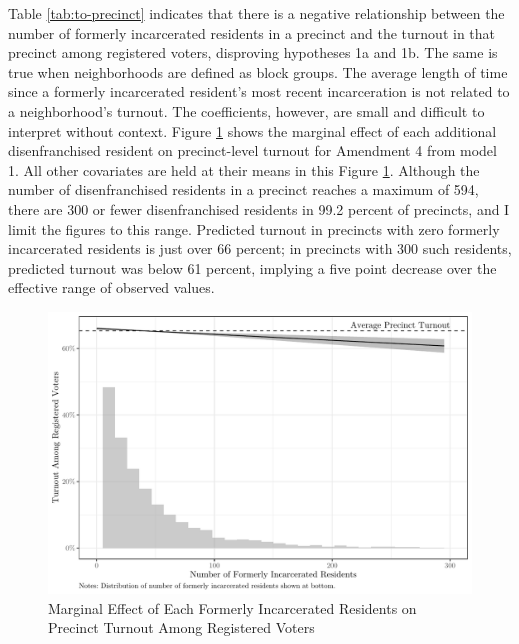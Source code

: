 \documentclass[
  12pt,
]{article}
\begin{document}
\begin{singlespace}


\end{singlespace}

Table \ref{tab:to-precinct} indicates that there is a negative relationship between the number of formerly incarcerated residents in a precinct and the turnout in that precinct among registered voters, disproving hypotheses 1a and 1b. The same is true when neighborhoods are defined as block groups. The average length of time since a formerly incarcerated resident's most recent incarceration is not related to a neighborhood's turnout. The coefficients, however, are small and difficult to interpret without context. Figure \ref{fig:marg1} shows the marginal effect of each additional disenfranchised resident on precinct-level turnout for Amendment 4 from model 1. All other covariates are held at their means in this Figure \ref{fig:marg1}. Although the number of disenfranchised residents in a precinct reaches a maximum of 594, there are 300 or fewer disenfranchised residents in 99.2 percent of precincts, and I limit the figures to this range. Predicted turnout in precincts with zero formerly incarcerated residents is just over 66 percent; in precincts with 300 such residents, predicted turnout was below 61 percent, implying a five point decrease over the effective range of observed values.

\begin{figure}[H]

{\centering \includegraphics{amendment_4_turnout_files/figure-latex/marg1-1} 

}

\caption{\label{fig:marg1}Marginal Effect of Each Formerly Incarcerated Residents on Precinct Turnout Among Registered Voters}\label{fig:marg1}
\end{figure}
\end{document}
